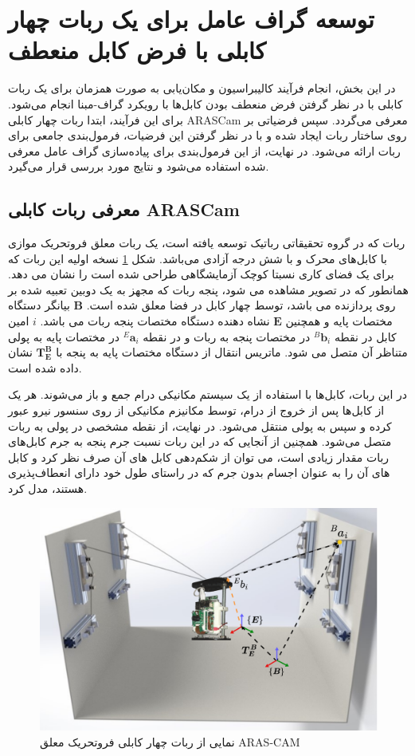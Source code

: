 \section{توسعه گراف عامل برای یک ربات چهار کابلی با فرض کابل منعطف}
در این بخش، انجام فرآیند کالیبراسیون و مکان‌یابی به صورت همزمان برای یک ربات کابلی با در نظر گرفتن فرض منعطف بودن کابل‌ها با رویکرد گراف-مبنا انجام می‌شود. برای این فرآیند، ابتدا ربات چهار کابلی ARASCam معرفی می‌گردد. سپس فرضیاتی بر روی ساختار ربات ایجاد شده و با در نظر گرفتن این فرضیات، فرمول‌بندی جامعی برای ربات ارائه می‌شود. در نهایت، از این فرمول‌بندی برای پیاده‌سازی گراف عامل معرفی شده استفاده می‌شود و نتایج مورد بررسی قرار می‌گیرد. 

\subsection{معرفی ربات کابلی ARASCam}
ربات  که در گروه تحقیقاتی رباتیک  توسعه یافته است، یک ربات معلق فروتحریک موازی با کابل‌های محرک و با شش درجه آزادی می‌باشد. شکل 
\ref{fig:arascam}
 نسخه اولیه این  ربات که برای یک فضای کاری نسبتا کوچک آزمایشگاهی طراحی شده است را نشان می دهد. همانطور که در تصویر مشاهده می شود، پنجه ربات که مجهز به یک دوبین تعبیه شده بر روی پردازنده 
می باشد، توسط چهار کابل در فضا معلق شده است. $\boldsymbol{B}$ بیانگر دستگاه مختصات پایه و همچنین $\boldsymbol{E}$ نشاه دهنده دستگاه مختصات پنجه ربات می باشد. $i$ امین کابل در نقطه ${}^B\!\boldsymbol{b}_i$ در مختصات پنجه به ربات و در نقطه ${}^E\!\boldsymbol{a}_i$ در مختصات پایه به پولی متناظر آن متصل می شود. ماتریس انتقال از دستگاه مختصات پایه به پنجه با 
$\boldsymbol{T}^{\boldsymbol{B}}_{\boldsymbol{E}}$
نشان داده شده است.


در این ربات، کابل‌ها با استفاده از یک سیستم مکانیکی درام جمع و باز می‌شوند. هر یک از کابل‌ها پس از خروج از درام، توسط مکانیزم مکانیکی از روی سنسور نیرو عبور کرده و سپس به پولی منتقل می‌شود. در نهایت، از نقطه مشخصی در پولی به ربات متصل می‌شود. همچنین از آنجایی که در این ربات نسبت جرم پنجه به جرم کابل‌های ربات مقدار زیادی است، می توان از شکم‌دهی کابل های آن صرف نظر کرد و کابل های آن را به عنوان اجسام بدون جرم که در راستای طول خود دارای انعطاف‌پذیری هستند، مدل کرد.

\begin{figure}
	\centering
	\includegraphics[width=0.5\linewidth]{img/arascam}
	\caption{نمایی از ربات چهار کابلی فروتحریک معلق ARAS-CAM}
	\label{fig:arascam}
\end{figure}

